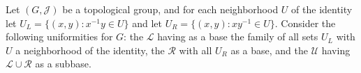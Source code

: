 Let $(G, \mathcal{J})$ be a topological group, and for each neighborhood $U$ of the identity let $U_L = \{(x, y) : x^{-1}y \in U\}$ and let $U_R = \{(x, y) : xy^{-1} \in U\}$. Consider the following uniformities for $G$: the  $\mathcal{L}$ having as a base the family of all sets $U_L$ with $U$ a neighborhood of the identity, the  $\mathcal{R}$ with all $U_R$ as a base, and the  $\mathcal{U}$ having $\mathcal{L} \cup \mathcal{R}$ as a subbase.
